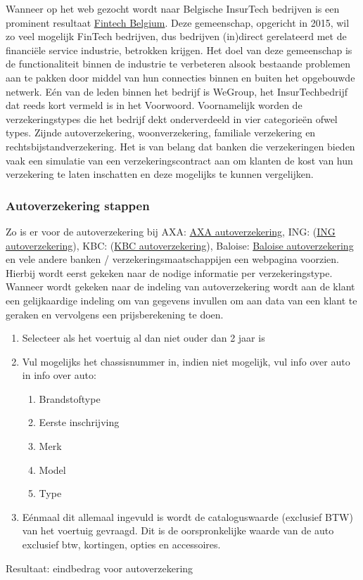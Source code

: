 Wanneer op het web gezocht wordt naar Belgische InsurTech bedrijven is een prominent resultaat \href{https://www.fintechbelgium.be/}{Fintech Belgium}. Deze gemeenschap, opgericht in 2015, wil zo veel mogelijk FinTech bedrijven, dus bedrijven (in)direct gerelateerd met de financiële service industrie, betrokken krijgen. Het doel van deze gemeenschap is de functionaliteit binnen de industrie te verbeteren alsook bestaande problemen aan te pakken door middel van hun connecties binnen en buiten het opgebouwde netwerk. Eén van de leden binnen het bedrijf is WeGroup, het InsurTechbedrijf dat reeds kort vermeld is in het Voorwoord. Voornamelijk worden de verzekeringstypes die het bedrijf dekt onderverdeeld in vier categorieën ofwel types. Zijnde autoverzekering, woonverzekering, familiale verzekering en rechtsbijstandverzekering.
Het is van belang dat banken die verzekeringen bieden vaak een simulatie van een verzekeringscontract aan om klanten de kost van hun verzekering te laten inschatten en deze mogelijks te kunnen vergelijken.

\subsubsection{Autoverzekering stappen}
Zo is er voor de autoverzekering bij AXA: \href{https://www.fo.axa.be/eauto/risk?dsfns=customers.be.axa.retail.mobility.contract.new.auto&LANG=nl}{AXA autoverzekering}, ING: (\href{https://www.ing.be/nl/retail/insurance/vehicles/car-insurance}{ING autoverzekering}), KBC: (\href{https://www.kbcbrussels.be/retail/en/processes/vehicle/autoverzekering-simuleren.html}{KBC autoverzekering}), Baloise: \href{https://www.berekenjeautopremie.be/nl/Baloise/l/met-welke-wagen-rijdt-u}{Baloise autoverzekering} en vele andere banken / verzekeringsmaatschappijen een webpagina voorzien.
Hierbij wordt eerst gekeken naar de nodige informatie per verzekeringstype.
Wanneer wordt gekeken naar de indeling van autoverzekering wordt aan de klant een gelijkaardige indeling om van gegevens invullen om aan data van een klant te geraken en vervolgens een prijsberekening te doen.
 
\begin{enumerate}[label=Stap \arabic*:]
	\item Selecteer als het voertuig al dan niet ouder dan 2 jaar is
	\item Vul mogelijks het chassisnummer in, indien niet mogelijk, vul info over auto in
	info over auto: 
	\begin{enumerate}
		\item Brandstoftype
		\item Eerste inschrijving
		\item Merk
		\item Model
		\item Type
	\end{enumerate}
	\item Eénmaal dit allemaal ingevuld is wordt de cataloguswaarde (exclusief BTW) van het voertuig gevraagd.
	Dit is de oorspronkelijke waarde van de auto exclusief btw, kortingen, opties en accessoires.
\end{enumerate}
Resultaat: eindbedrag voor autoverzekering

